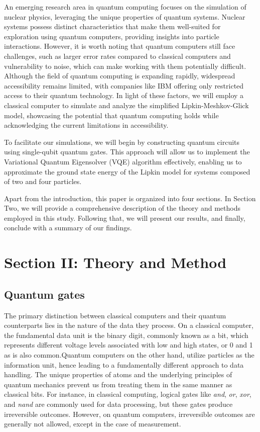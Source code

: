 \documentclass[onecolumn,10pt,cleanfoot]{asme2ej}
\begin{document}
An emerging research area in quantum computing focuses on the simulation of nuclear physics, leveraging the unique properties of quantum systems. Nuclear systems possess distinct characteristics that make them well-suited for exploration using quantum computers, providing insights into particle interactions. However, it is worth noting that quantum computers still face challenges, such as larger error rates compared to classical computers and vulnerability to noise, which can make working with them potentially difficult. Although the field of quantum computing is expanding rapidly, widespread accessibility remains limited, with companies like IBM offering only restricted access to their quantum technology. In light of these factors, we will employ a classical computer to simulate and analyze the simplified Lipkin-Meshkov-Glick model, showcasing the potential that quantum computing holds while acknowledging the current limitations in accessibility.

To facilitate our simulations, we will begin by constructing quantum circuits using single-qubit quantum gates. This approach will allow us to implement the Variational Quantum Eigensolver (VQE) algorithm effectively, enabling us to approximate the ground state energy of the Lipkin model for systems composed of two and four particles.

Apart from the introduction, this paper is organized into four sections. In Section Two, we will provide a comprehensive description of the theory and methods employed in this study. Following that, we will present our results, and finally, conclude with a summary of our findings.
 
 \section{\textbf{Section II: Theory and Method \\}}

 \subsection{Quantum gates}
The primary distinction between classical computers and their quantum counterparts lies in the nature of the data they process. On a classical computer, the fundamental data unit is the binary digit, commonly known as a bit, which represents different voltage levels associated with low and high states, or 0 and 1 as is also common.Quantum computers on the other hand, utilize particles as the information unit, hence leading to a fundamentally different approach to data handling. The unique properties of atoms and the underlying principles of quantum mechanics prevent us from treating them in the same manner as classical bits. For instance, in classical computing, logical gates like \textit{and}, \textit{or}, \textit{xor}, and \textit{nand} are commonly used for data processing, but these gates produce irreversible outcomes. However, on quantum computers, irreversible outcomes are generally not allowed, except in the case of measurement.
\end{document}
